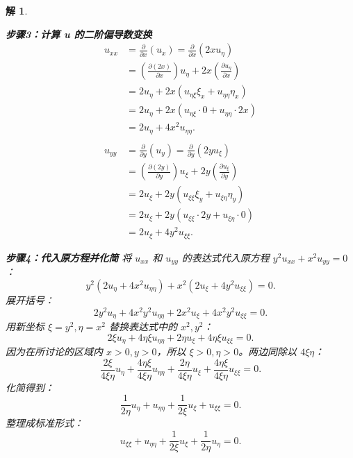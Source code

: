 \documentclass[12pt,a4paper]{article}
\newtheorem*{solution}{解}
\begin{document}
\begin{solution}
\begin{enumerate}[(1)]
		\textbf{步骤3：计算 u 的二阶偏导数变换}
		\begin{align*}
			u_{xx} &= \frac{\partial}{\partial x}(u_x) = \frac{\partial}{\partial x}(2x u_\eta) \\
			&= \left(\frac{\partial (2x)}{\partial x}\right) u_\eta + 2x \left(\frac{\partial u_\eta}{\partial x}\right) \\
			&= 2u_\eta + 2x (u_{\eta\xi}\xi_x + u_{\eta\eta}\eta_x) \\
			&= 2u_\eta + 2x (u_{\eta\xi} \cdot 0 + u_{\eta\eta} \cdot 2x) \\
			&= 2u_\eta + 4x^2 u_{\eta\eta}. \\
			\\
			u_{yy} &= \frac{\partial}{\partial y}(u_y) = \frac{\partial}{\partial y}(2y u_\xi) \\
			&= \left(\frac{\partial (2y)}{\partial y}\right) u_\xi + 2y \left(\frac{\partial u_\xi}{\partial y}\right) \\
			&= 2u_\xi + 2y (u_{\xi\xi}\xi_y + u_{\xi\eta}\eta_y) \\
			&= 2u_\xi + 2y (u_{\xi\xi} \cdot 2y + u_{\xi\eta} \cdot 0) \\
			&= 2u_\xi + 4y^2 u_{\xi\xi}.
		\end{align*}
		
		\textbf{步骤4：代入原方程并化简}
		将 \(u_{xx}\) 和 \(u_{yy}\) 的表达式代入原方程 \(y^2 u_{xx} + x^2 u_{yy} = 0\)：
		\[
		y^2(2u_\eta + 4x^2 u_{\eta\eta}) + x^2(2u_\xi + 4y^2 u_{\xi\xi}) = 0.
		\]
		展开括号：
		\[
		2y^2 u_\eta + 4x^2y^2 u_{\eta\eta} + 2x^2 u_\xi + 4x^2y^2 u_{\xi\xi} = 0.
		\]
		用新坐标 \(\xi=y^2, \eta=x^2\) 替换表达式中的 \(x^2, y^2\)：
		\[
		2\xi u_\eta + 4\eta\xi u_{\eta\eta} + 2\eta u_\xi + 4\eta\xi u_{\xi\xi} = 0.
		\]
		因为在所讨论的区域内 \(x>0, y>0\)，所以 \(\xi>0, \eta>0\)。两边同除以 \(4\xi\eta\)：
		\[
		\frac{2\xi}{4\xi\eta}u_\eta + \frac{4\eta\xi}{4\xi\eta}u_{\eta\eta} + \frac{2\eta}{4\xi\eta}u_\xi + \frac{4\eta\xi}{4\xi\eta}u_{\xi\xi} = 0.
		\]
		化简得到：
		\[
		\frac{1}{2\eta}u_\eta + u_{\eta\eta} + \frac{1}{2\xi}u_\xi + u_{\xi\xi} = 0.
		\]
		整理成标准形式：
		\[
		u_{\xi\xi} + u_{\eta\eta} + \frac{1}{2\xi}u_\xi + \frac{1}{2\eta}u_\eta = 0.
		\]
		\end{enumerate}
	\end{solution}
	
\end{document}
